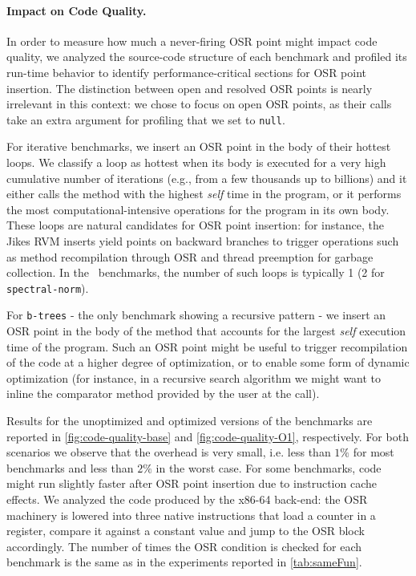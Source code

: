 \paragraph{Impact on Code Quality.}
In order to measure how much a never-firing OSR point might impact code quality, we analyzed the source-code structure of each benchmark and profiled its run-time behavior to identify performance-critical sections for OSR point insertion. The distinction between open and resolved OSR points is nearly irrelevant in this context: we chose to focus on open OSR points, as their calls take an extra argument for profiling that we set to {\tt null}.

For iterative benchmarks, we insert an OSR point in the body of their hottest loops. We classify a loop as hottest when its body is executed for a very high cumulative number of iterations (e.g., from a few thousands up to billions) and it either calls the method with the highest {\em self} time in the program, or it performs the most computational-intensive operations for the program in its own body. These loops are natural candidates for OSR point insertion: for instance, the Jikes RVM inserts yield points on backward branches to trigger operations such as method recompilation through OSR and thread preemption for garbage collection. In the \shootout\ benchmarks, the number of such loops is typically 1 (2 for {\tt spectral-norm}).

For {\tt b-trees} - the only benchmark showing a recursive pattern - we insert an OSR point in the body of the method that accounts for the largest {\em self} execution time of the program. Such an OSR point might be useful to trigger recompilation of the code at a higher degree of optimization, or to enable some form of dynamic optimization (for instance, in a recursive search algorithm we might want to inline the comparator method provided by the user at the call).

Results for the unoptimized and optimized versions of the benchmarks are reported in \myfigure\ref{fig:code-quality-base} and \myfigure\ref{fig:code-quality-O1}, respectively. For both scenarios we observe that the overhead is very small, i.e. less than $1\%$ for most benchmarks and less than $2\%$ in the worst case. For some benchmarks, code might run slightly faster after OSR point insertion due to instruction cache effects. We analyzed the code produced by the x86-64 back-end: the OSR machinery is lowered into three native instructions that load a counter in a register, compare it against a constant value and jump to the OSR block accordingly. The number of times the OSR condition is checked for each benchmark is the same as in the experiments reported in \mytable\ref{tab:sameFun}.
  
